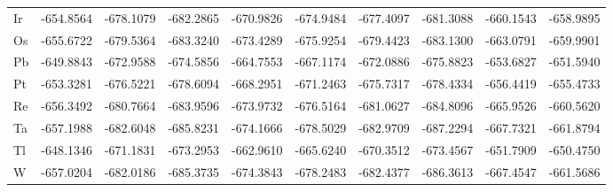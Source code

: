\begin{table}[htbp]
{\begin{tabular}{l *{9}{l}}
        Ir	& -654.8564	&-678.1079	&-682.2865	&-670.9826	&-674.9484	&-677.4097	&-681.3088	&-660.1543	&-658.9895 \\
        Os	& -655.6722	&-679.5364	&-683.3240  &-673.4289	&-675.9254	&-679.4423	&-683.1300	&-663.0791	&-659.9901 \\
        Pb	& -649.8843	&-672.9588	&-674.5856	&-664.7553	&-667.1174	&-672.0886	&-675.8823	&-653.6827	&-651.5940 \\
        Pt	& -653.3281	&-676.5221	&-678.6094	&-668.2951	&-671.2463	&-675.7317	&-678.4334	&-656.4419	&-655.4733 \\
        Re	& -656.3492	&-680.7664	&-683.9596	&-673.9732	&-676.5164	&-681.0627	&-684.8096	&-665.9526	&-660.5620 \\
        Ta	& -657.1988	&-682.6048	&-685.8231	&-674.1666	&-678.5029	&-682.9709	&-687.2294	&-667.7321	&-661.8794 \\
        Tl	& -648.1346	&-671.1831	&-673.2953	&-662.9610  &-665.6240  &-670.3512	&-673.4567	&-651.7909	&-650.4750 \\
        W	  & -657.0204	&-682.0186	&-685.3735	&-674.3843	&-678.2483	&-682.4377	&-686.3613	&-667.4547	&-661.5686 \\
        \bottomrule
      \end{tabular}
    }
\end{table}

